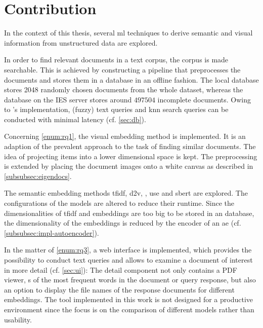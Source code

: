 \section{Contribution}\label{sec:contribution}

In the context of this thesis, several \ac{ml} techniques to derive semantic and visual information 
from unstructured data are explored.

In order to find relevant documents in a text corpus, the corpus is made searchable.
This is achieved by constructing a pipeline that preprocesses the documents 
and stores them in a database in an offline fashion.
The local \databaseName{} database stores 2048 randomly chosen documents from the whole dataset, 
whereas the database on the IES server stores around $497504$ incomplete documents.
Owing to \databaseName{}'s implementation, (fuzzy) text queries and \ac{knn} search queries 
can be conducted with minimal latency (cf. \autoref{sec:db}).

Concerning \ref{enum:rq1}, the visual embedding method \eigendocs{} is implemented.
It is an adaption of the prevalent \eigenfaces{} approach to the task of finding similar documents.
The idea of projecting items into a lower dimensional space is kept.
The preprocessing is extended by placing the document images onto a white canvas 
as described in \autoref{subsubsec:eigendocs}.

The semantic embedding methods \ac{tfidf}, \ac{d2v}, \infersent{}, \ac{use} and \ac{sbert} are explored.
The configurations of the models are altered to reduce their runtime.
Since the dimensionalities of \ac{tfidf} and \infersent{} embeddings are too big 
to be stored in an \databaseName{} database, 
the dimensionality of the embeddings is reduced by the encoder of an \ac{ae} 
(cf. \autoref{subsubsec:impl-autoencoder}).
 
In the matter of \ref{enum:rq3}, a web interface is implemented, 
which provides the possibility to conduct text queries and
allows to examine a document of interest in more detail (cf. \autoref{sec:ui}):
The detail component not only contains a PDF viewer, 
\wordcloud{}s of the most frequent words in the document or query response, 
but also an option to display the file names of the response documents for different embeddings.
The tool implemented in this work is not designed for a productive environment since 
the focus is on the comparison of different models rather than usability.

